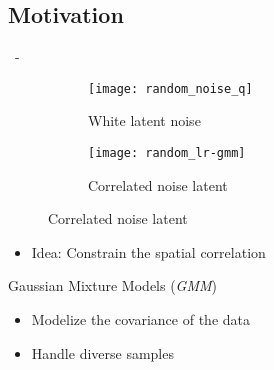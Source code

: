 \documentclass[aspectratio=169, 22pt]{beamer}
\begin{document}
\subsection{Motivation}
\begin{frame}{\secname~- \subsecname}
  \begin{figure}\centering
    \begin{subfigure}{0.3\linewidth}\centering
      \texttt{[image: random\_noise\_q]}
      \caption{White latent noise}
    \end{subfigure}
    \begin{subfigure}{0.3\linewidth}\centering
      \texttt{[image: random\_lr-gmm]}
      \caption{Correlated noise latent}
    \end{subfigure}
  \end{figure}
  \begin{itemize}\centering
  \item \alert{Idea}: Constrain the \alert{spatial correlation} 
  \end{itemize}
  \begin{exampleblock}{Gaussian Mixture Models (\emph{GMM})}
    \begin{itemize}
    \item Modelize the covariance of the data
    \item Handle diverse samples
    \end{itemize}
  \end{exampleblock}  
\end{frame}
\end{document}
